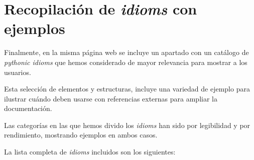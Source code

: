\documentclass[a4paper, 12pt]{book}
\begin{document}
\section{Recopilación de \textit{idioms} con ejemplos}

Finalmente, en la misma página web se incluye un apartado con un catálogo de \textit{pythonic idioms} que hemos considerado de mayor relevancia para mostrar a los usuarios.

Esta selección de elementos y estructuras, incluye una variedad de ejemplo para ilustrar cuándo deben usarse con referencias externas para ampliar la documentación.

Las categorías en las que hemos divido los \textit{idioms} han sido por legibilidad y por rendimiento, mostrando ejemplos en ambos casos.

La lista completa de \textit{idioms} incluidos son los siguientes:
\end{document}
